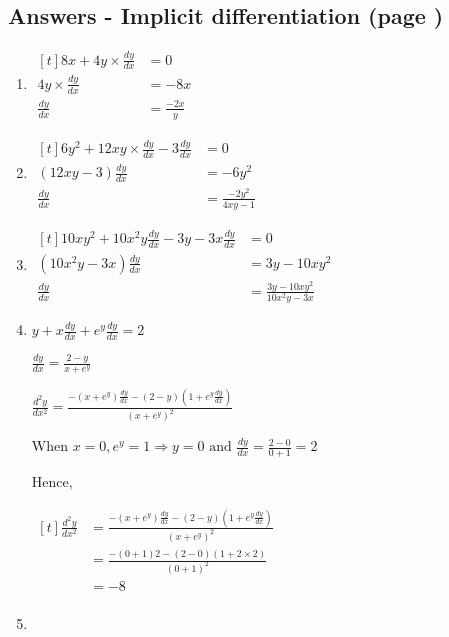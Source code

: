 \documentclass[../main.tex]{subfiles}
\begin{document}
\subsection*{Answers - Implicit differentiation (page \pageref{Implicit Differentiation})}
\label{Implicit differentiation answers}
\begin{spacing}{1.5}
\begin{enumerate}
    \item
    $
    \!
    \begin{aligned}[t]
        8x + 4y\times\frac{dy}{dx}
        &= 0 \\
        4y\times\frac{dy}{dx}
        &=-8x\\
        \frac{dy}{dx}
        &=\frac{-2x}{y}
    \end{aligned}
    $
    \item 
    $
    \!
    \begin{aligned}[t]
        6y^2+12xy\times\frac{dy}{dx}-3\frac{dy}{dx}
        &=0\\
        (12xy-3)\frac{dy}{dx}
        &=-6y^2\\
        \frac{dy}{dx}
        &=\frac{-2y^2}{4xy-1}
    \end{aligned}
    $
    \item 
    $
    \!
    \begin{aligned}[t]
        10xy^2+10x^2y\frac{dy}{dx}-3y-3x\frac{dy}{dx}
        &=0\\
        (10x^2y-3x)\frac{dy}{dx}
        &=3y-10xy^2\\
        \frac{dy}{dx}
        &=\frac{3y-10xy^2}{10x^2y-3x}
    \end{aligned}
    $
    \item 
    \(y+x\frac{dy}{dx}+e^y\frac{dy}{dx}=2\)

    \(\frac{dy}{dx}=\frac{2-y}{x+e^y} \) 

    \(\frac{d^2y}{dx^2}=\frac{-(x+e^y)\frac{dy}{dx}-(2-y)(1+e^y\frac{dy}{dx})}{(x+e^y)^2}\)

    When \(x=0, e^y=1\Rightarrow{}y=0\text{ and }\frac{dy}{dx}=\frac{2-0}{0+1}=2\)

    Hence,

    $
    \!
    \begin{aligned}[t]
        \frac{d^2y}{dx^2}
        &=\frac{-(x+e^y)\frac{dy}{dx}-(2-y)(1+e^y\frac{dy}{dx})}{(x+e^y)^2}\\
        &=\frac{-(0+1)2-(2-0)(1+2\times2)}{(0+1)^2}\\
        &=-8\\
    \end{aligned}
    $
    \item 
    

\end{enumerate}
\end{spacing}
\end{document}
